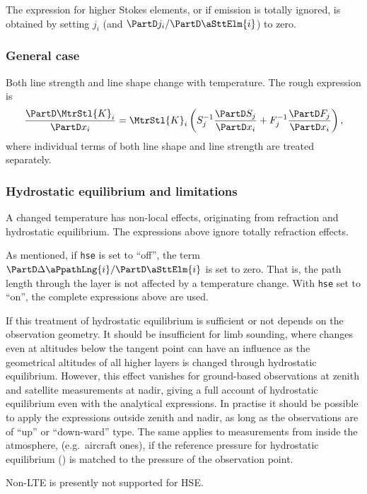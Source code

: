 The expression for higher Stokes elements, or if emission is totally ignored,
is obtained by setting $j_i$ (and $\PartD j_i/\PartD\aSttElm{i}$) to zero.


\subsubsection{General case}
%
Both line strength and line shape change with temperature.
The rough expression is
\begin{equation}
  \frac{\PartD \MtrStl{K}_i}{\PartD x_i} = \MtrStl{K}_i
  \left(
  S_j^{-1}\frac{\PartD S_j}{\PartD x_i}+
  F_j^{-1}\frac{\PartD F_j}{\PartD x_i}
  \right),
\end{equation}
where individual terms of both line shape and line strength are
treated separately.

\subsubsection{Hydrostatic equilibrium and limitations}
%
A changed temperature has non-local effects, originating from refraction and
hydrostatic equilibrium. The expressions above ignore totally refraction
effects. 

As  mentioned,  if \verb|hse|  is  set  to  ``off'',  the term  $\PartD  \Delta
\aPpathLng{i}/\PartD\aSttElm{i}$  is set  to  zero. That  is,  the path  length
through the layer is not affected  by a temperature change. With \verb|hse| set
to ``on'', the complete expressions above are used.

If this treatment of hydrostatic equilibrium is sufficient or not depends on
the observation geometry. It should be insufficient for limb sounding,
where changes even at altitudes below the tangent point can have an influence
as the geometrical altitudes of all higher layers is changed through
hydrostatic equilibrium.  However, this effect vanishes for
ground-based observations at zenith and satellite measurements at nadir, giving
a full account of hydrostatic equilibrium even with the analytical expressions.
In practise it should be possible to apply the expressions outside zenith and
nadir, as long as the observations are of ``up'' or ``down-ward'' type. The
same applies to measurements from inside the atmosphere, (e.g.\ aircraft ones),
if the reference pressure for hydrostatic equilibrium () is
matched to the pressure of the observation point.

Non-LTE is presently not supported for HSE.

